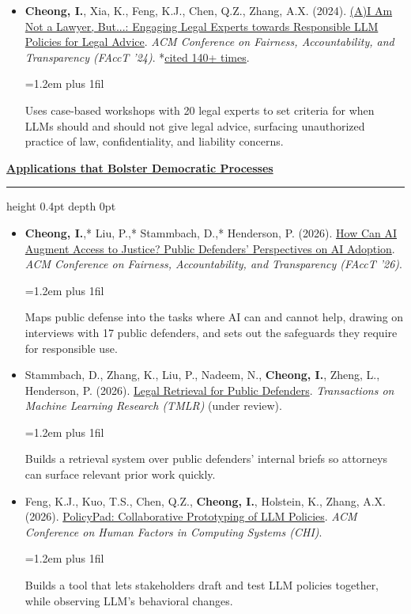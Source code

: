 \documentclass[10pt]{article}
\newcommand{\pubtheme}[1]{%
  \par\vspace{7pt}%
  \noindent
  {\small\bfseries\color{black}\uline{#1}}%
  \nobreak\hspace{0.4em}%
  \leaders\hrule height 0.4pt depth 0pt \hfill\par
  \vspace{2pt}%
}
\newcommand{\pubdesc}[1]{%
  \par\vspace{1pt}%
  \begingroup
  \leftskip=1.2em
  \rightskip=0pt plus 1fil\relax
  \parfillskip=0pt\relax
  {\footnotesize\color{black!58}#1\par}%
  \endgroup
}
\begin{document}
{\begin{itemize}[itemsep=4pt]
\pubdesc{Sketches the research framework on utilizing agency law principles for building evaluation benchmarks.}
\item \textbf{Cheong, I.}, Xia, K., Feng, K.J., Chen, Q.Z., Zhang, A.X. (2024). \href{https://dl.acm.org/doi/abs/10.1145/3630106.3659048}{(A)I Am Not a Lawyer, But...: Engaging Legal Experts towards Responsible LLM Policies for Legal Advice}. \textit{ACM Conference on Fairness, Accountability, and Transparency (FAccT '24)}. *\href{https://scholar.google.com/citations?user=xwZI_jcAAAAJ&hl=en}{cited 140+ times}.
\pubdesc{Uses case-based workshops with 20 legal experts to set criteria for when LLMs should and should not give legal advice, surfacing unauthorized practice of law, confidentiality, and liability concerns.}

\end{itemize}
\pubtheme{Applications that Bolster Democratic Processes}
\begin{itemize}[itemsep=4pt]
\item \textbf{Cheong, I.},* Liu, P.,* Stammbach, D.,* Henderson, P. (2026). \href{https://arxiv.org/abs/2510.22933}{How Can AI Augment Access to Justice? Public Defenders' Perspectives on AI Adoption}. \textit{ACM Conference on Fairness, Accountability, and Transparency (FAccT '26)}.
\pubdesc{Maps public defense into the tasks where AI can and cannot help, drawing on interviews with 17 public defenders, and sets out the safeguards they require for responsible use.}
\item Stammbach, D., Zhang, K., Liu, P., Nadeem, N., \textbf{Cheong, I.}, Zheng, L., Henderson, P. (2026). \href{https://arxiv.org/html/2601.14348v2}{Legal Retrieval for Public Defenders}. \textit{Transactions on Machine Learning Research (TMLR)} (under review).
\pubdesc{Builds a retrieval system over public defenders' internal briefs so attorneys can surface relevant prior work quickly.}
\item Feng, K.J., Kuo, T.S., Chen, Q.Z., \textbf{Cheong, I.}, Holstein, K., Zhang, A.X. (2026). \href{https://dl.acm.org/doi/full/10.1145/3772318.3791689}{PolicyPad: Collaborative Prototyping of LLM Policies}. \textit{ACM Conference on Human Factors in Computing Systems (CHI)}.
\pubdesc{Builds a tool that lets stakeholders draft and test LLM policies together, while observing LLM's behavioral changes.}
\end{itemize}
}
\end{document}
